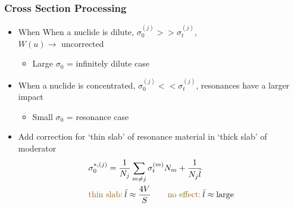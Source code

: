 \documentclass[xcolor=x11names,compress]{beamer}
\renewcommand{\(}{\begin{columns}}
\renewcommand{\)}{\end{columns}}
\newcommand{\<}[1]{\begin{column}{#1}}
\renewcommand{\>}{\end{column}}
\begin{document}
\begin{frame}[fragile]
  \frametitle{Cross Section Processing}

	\begin{itemize}
	\item When When a nuclide is dilute, $\sigma_0^{(j)} >>
	 \sigma_t^{(j)}$, \\$W(u) \rightarrow$ uncorrected 
		\begin{itemize}
		\item Large $\sigma_0$ = infinitely dilute case	
		\end{itemize}

	\item When a nuclide is concentrated, $\sigma_0^{(j)} << 
	 \sigma_t^{(j)}$, resonances have a larger impact 
		\begin{itemize}
		\item Small $\sigma_0$ = resonance case	
		\end{itemize}
	\end{itemize}
	
	\begin{itemize}
	\item Add correction for `thin slab' of resonance material in 
	`thick slab' of moderator
	\begin{align}
  	&\sigma_0^{*,(j)} = \frac{1}{N_j} \sum_{m \ne j} \sigma_{t}^{(m)} N_m 
	+ \frac{1}{N_j \bar{l}} \\
  	&\text{\textcolor{byellow}{thin slab:}}\:\bar{l} \approx \frac{4V}{S} \qquad \text{\textcolor{byellow}{no effect:}}\:\bar{l} \approx \text{large} \nonumber
	\end{align}
	\end{itemize}
  
\end{frame}

\end{document}
